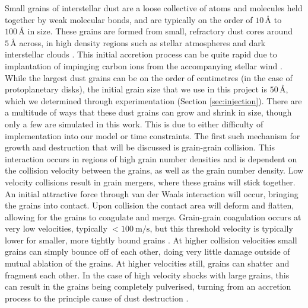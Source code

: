 Small grains of interstellar dust are a loose collective of atoms and molecules held together by weak molecular bonds, and are typically on the order of $10 \, \si{\angstrom}$ to $100 \, \si{\angstrom}$ in size.
These grains are formed from small, refractory dust cores around $5\,\si{\angstrom}$ across, in high density regions such as stellar atmospheres and dark interstellar clouds \parencite{spitzerPhysicalProcessesInterstellar2008}.
This initial accretion process can be quite rapid due to implantation of impinging carbon ions from the accompanying stellar wind \parencite{zubkoPhysicalModelDust1998a}.
While the largest dust grains can be on the order of centimetres (in the case of protoplanetary disks), the initial grain size that we use in this project is $50 \, \si{\angstrom}$, which we determined through experimentation (Section \ref{sec:injection}).
There are a multitude of ways that these dust grains can grow and shrink in size, though only a few are simulated in this work.
This is due to either difficulty of implementation into our model or time constraints.
The first such mechanism for growth and destruction that will be discussed is grain-grain collision.
This interaction occurs in regions of high grain number densities and is dependent on the collision velocity between the grains, as well as the grain number density.
Low velocity collisions result in grain mergers, where these grains will stick together.
An initial attractive force through van der Waals interaction will occur, bringing the grains into contact.
Upon collision the contact area will deform and flatten, allowing for the grains to coagulate and merge.
Grain-grain coagulation occurs at very low velocities, typically $<\SI{100}{\metre\per\second}$, but this threshold velocity is typically lower for smaller, more tightly bound grains
\parencite{chokshiDustCoagulation1993}.
At higher collision velocities small grains can simply bounce off of each other, doing very little damage outside of mutual ablation of the grains.
At higher velocities still, grains can shatter and fragment each other.
In the case of high velocity shocks with large grains, this can result in the grains being completely pulverised, turning from an accretion process to the principle cause of dust destruction
\parencite{jonesGrainShatteringShocks1996,jonesDustDestructionProcesses2004}.


